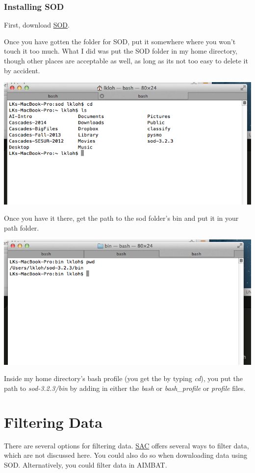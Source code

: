 \documentclass[letterpaper,10pt,english]{sphinxmanual}
\begin{document}
\subsection{Installing SOD}
\label{docfiles/gettingData:installing-sod}
First, download \href{http://www.seis.sc.edu/index.html}{SOD}.

Once you have gotten the folder for SOD, put it somewhere where you won't touch it too much. What I did was put the SOD folder in my home directory, though other places are acceptable as well, as long as its not too easy to delete it by accident.

\includegraphics{sod_location.png}

Once you have it there, get the path to the sod folder's bin and put it in your path folder.

\includegraphics{path_to_sod_bin.png}

Inside my home directory's bash profile (you get the by typing \emph{cd}), you put the path to \emph{sod-3.2.3/bin} by adding in either the \emph{bash} or \emph{bash\_profile} or \emph{profile} files.


\chapter{Filtering Data}
\label{docfiles/filteringData::doc}\label{docfiles/filteringData:filtering-data}
There are several options for filtering data. \href{http://www.iris.edu/files/sac-manual/}{SAC} offers several ways to filter data, which are not discussed here. You could also do so when downloading data using SOD. Alternatively, you could filter data in AIMBAT.
\end{document}
